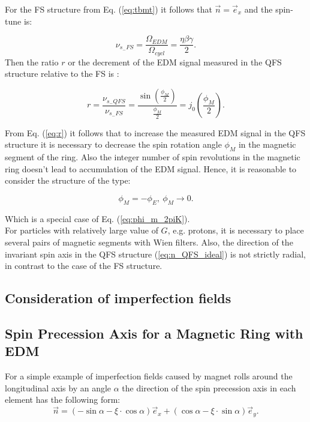 \documentclass[%
  aps,
  pra,
  preprint,
  a4paper,
  amsmath,
  amssymb,
  floatfix,
  longbibliography,
  superscriptaddress
]{revtex4-2}
\begin{document}
For the FS structure \cite{Farley:2004hp} from Eq. (\ref{eq:tbmt}) it follows that $\vec{n}=\vec{e}_x$ and the spin-tune is:

\begin{equation}
	\nu_{s_{-}FS}=\frac{\Omega_{EDM}}{\Omega_{cycl}}=\frac{\eta\beta\gamma}{2}.
\end{equation}  
Then the ratio $r$ or the decrement of the EDM signal measured in the QFS structure relative to the FS is \cite{Melnikov:2025gdj}:

\begin{equation}\label{eq:r}
	r=\frac{\nu_{s_{-}QFS}}{\nu_{s_{-}FS}}=\frac{\sin\left(\frac{\phi_M}{2}\right)}{\frac{\phi_M}{2}}=j_0\left(\frac{\phi_M}{2}\right).
\end{equation} 

From Eq. (\ref{eq:r}) it follows that to increase the measured EDM signal in the QFS structure it is necessary to decrease the spin rotation angle $\phi_M$
in the magnetic segment of the ring. Also the integer number of spin revolutions in the magnetic ring doesn't lead to accumulation of the EDM signal. Hence, it is reasonable to consider the structure of the type:

\begin{equation}\label{eq:QFS_condition}
	\phi_M=-\phi_E,~\phi_M \to 0.
\end{equation} 

Which is a special case of Eq. (\ref{eq:phi_m_2piK}).\\
For particles with relatively large value of $G$, e.g. protons, it is necessary to place several pairs of magnetic segments with Wien filters. Also, the direction of the invariant spin axis in the QFS structure (\ref{eq:n_QFS_ideal}) is not strictly radial, in contrast to the case of the FS structure. 






\subsection{Consideration of imperfection fields}
\subsection{Spin Precession Axis for a Magnetic Ring with EDM}
For a simple example of imperfection fields caused by magnet rolls around the longitudinal axis by an angle $\alpha$ the direction of the spin precession axis in each element has the following form:
\begin{equation}\label{}
	\vec{n}=\left(-\sin\alpha-\xi \cdot \cos \alpha\right)\vec{e}_x+\left(\cos\alpha-\xi \cdot \sin \alpha\right)\vec{e}_y.
\end{equation} 
\end{document}
